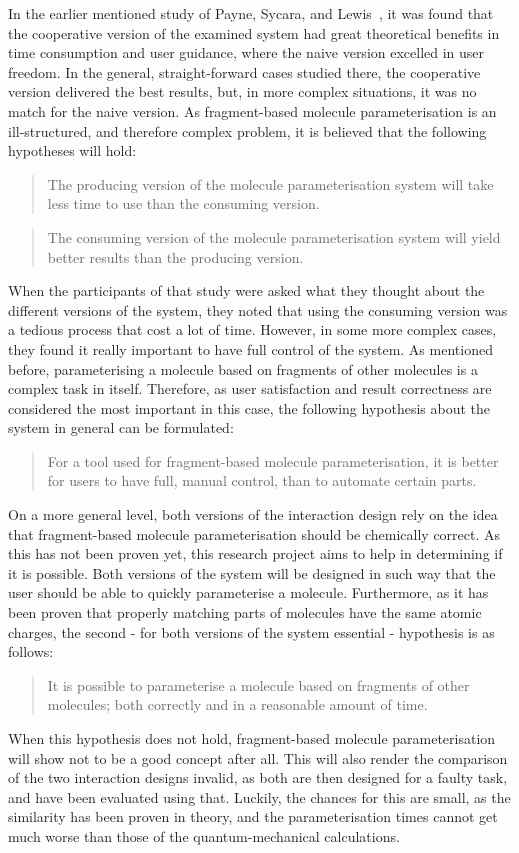 In the earlier mentioned study of Payne, Sycara, and Lewis~\cite{payne2000varying}, it was found that the cooperative version of the examined system had great theoretical benefits in time consumption and user guidance, where the naive version excelled in user freedom. In the general, straight-forward cases studied there, the cooperative version delivered the best results, but, in more complex situations, it was no match for the naive version. As fragment-based molecule parameterisation is an ill-structured, and therefore complex problem, it is believed that the following hypotheses will hold:
\begin{quote}
The producing version of the molecule parameterisation system will take less time to use than the consuming version.
\end{quote}
\begin{quote}
The consuming version of the molecule parameterisation system will yield better results than the producing version.
\end{quote}

When the participants of that study were asked what they thought about the different versions of the system, they noted that using the consuming version was a tedious process that cost a lot of time. However, in some more complex cases, they found it really important to have full control of the system. As mentioned before, parameterising a molecule based on fragments of other molecules is a complex task in itself. Therefore, as user satisfaction and result correctness are considered the most important in this case, the following hypothesis about the system in general can be formulated:
\begin{quote}
For a tool used for fragment-based molecule parameterisation, it is better for users to have full, manual control, than to automate certain parts.
\end{quote}

On a more general level, both versions of the interaction design rely on the idea that fragment-based molecule parameterisation should be chemically correct. As this has not been proven yet, this research project aims to help in determining if it is possible. Both versions of the system will be designed in such way that the user should be able to quickly parameterise a molecule. Furthermore, as it has been proven that properly matching parts of molecules have the same atomic charges, the second - for both versions of the system essential - hypothesis is as follows:
\begin{quote}
It is possible to parameterise a molecule based on fragments of other molecules; both correctly and in a reasonable amount of time.
\end{quote}

When this hypothesis does not hold, fragment-based molecule parameterisation will show not to be a good concept after all. This will also render the comparison of the two interaction designs invalid, as both are then designed for a faulty task, and have been evaluated using that. Luckily, the chances for this are small, as the similarity has been proven in theory, and the parameterisation times cannot get much worse than those of the quantum-mechanical calculations.
